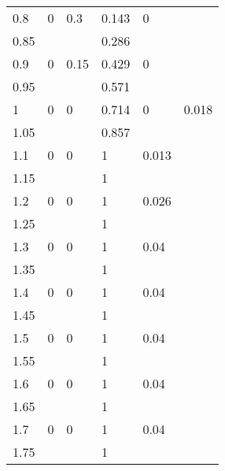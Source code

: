 \begin{center}
\begin{tabular}{llllll}
0.8          & 0            & 0.3           & 0.143                   & 0              \\
0.85         &              &               & 0.286                        &                \\
0.9          & 0            & 0.15          & 0.429                   & 0              \\
0.95         &              &               & 0.571                      &                \\
1            & 0            & 0             & 0.714                     & 0         & 0.018     \\
1.05         &              &               & 0.857                      &                \\
1.1          & 0            & 0             & 1                         & 0.013          \\
1.15         &              &               & 1                         &                \\
1.2          & 0            & 0             & 1                         & 0.026          \\
1.25         &              &               & 1                            &                \\
1.3          & 0            & 0             & 1                         & 0.04           \\
1.35         &              &               & 1                           &                \\
1.4          & 0            & 0             & 1                          & 0.04           \\
1.45         &              &               & 1                            &                \\
1.5          & 0            & 0             & 1                          & 0.04           \\
1.55         &              &               & 1                           &                \\
1.6          & 0            & 0             & 1                          & 0.04           \\
1.65         &              &               & 1                            &                \\
1.7          & 0            & 0             & 1                         & 0.04           \\
1.75         &              &               & 1                          &                \\

\end{tabular}
\end{center}
